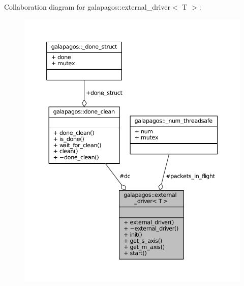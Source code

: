 Collaboration diagram for galapagos\+:\+:external\+\_\+driver$<$ T $>$\+:
\nopagebreak
\begin{figure}[H]
\begin{center}
\leavevmode
\includegraphics[width=350pt]{classgalapagos_1_1external__driver__coll__graph}
\end{center}
\end{figure}
